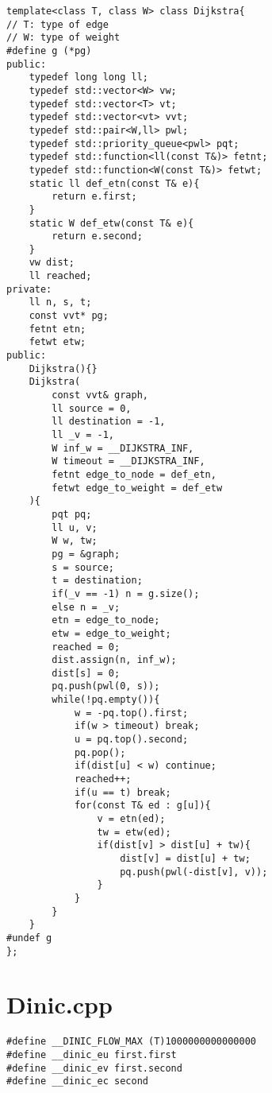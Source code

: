 \documentclass[a4paper,landscape,8pt]{extarticle}
\begin{document}
\begin{multicols}{3}
\begin{lstlisting}
template<class T, class W> class Dijkstra{
// T: type of edge
// W: type of weight
#define g (*pg)
public:
    typedef long long ll;
    typedef std::vector<W> vw;
    typedef std::vector<T> vt;
    typedef std::vector<vt> vvt;
    typedef std::pair<W,ll> pwl;
    typedef std::priority_queue<pwl> pqt;
    typedef std::function<ll(const T&)> fetnt;
    typedef std::function<W(const T&)> fetwt;
    static ll def_etn(const T& e){
        return e.first;
    }
    static W def_etw(const T& e){
        return e.second;
    }
    vw dist;
    ll reached;
private:
    ll n, s, t;
    const vvt* pg;
    fetnt etn;
    fetwt etw;
public:
    Dijkstra(){}
    Dijkstra(
        const vvt& graph,
        ll source = 0,
        ll destination = -1,
        ll _v = -1,
        W inf_w = __DIJKSTRA_INF,
        W timeout = __DIJKSTRA_INF,
        fetnt edge_to_node = def_etn,
        fetwt edge_to_weight = def_etw
    ){
        pqt pq;
        ll u, v;
        W w, tw;
        pg = &graph;
        s = source;
        t = destination;
        if(_v == -1) n = g.size();
        else n = _v;
        etn = edge_to_node;
        etw = edge_to_weight;
        reached = 0;
        dist.assign(n, inf_w);
        dist[s] = 0;
        pq.push(pwl(0, s));
        while(!pq.empty()){
            w = -pq.top().first;
            if(w > timeout) break;
            u = pq.top().second;
            pq.pop();
            if(dist[u] < w) continue;
            reached++;
            if(u == t) break;
            for(const T& ed : g[u]){
                v = etn(ed);
                tw = etw(ed);
                if(dist[v] > dist[u] + tw){
                    dist[v] = dist[u] + tw;
                    pq.push(pwl(-dist[v], v));
                }
            }
        }
    }
#undef g
};
\end{lstlisting}

\section*{Dinic.cpp}

\begin{lstlisting}
#define __DINIC_FLOW_MAX (T)1000000000000000
#define __dinic_eu first.first
#define __dinic_ev first.second
#define __dinic_ec second


\end{lstlisting}
\end{multicols}
\end{document}
